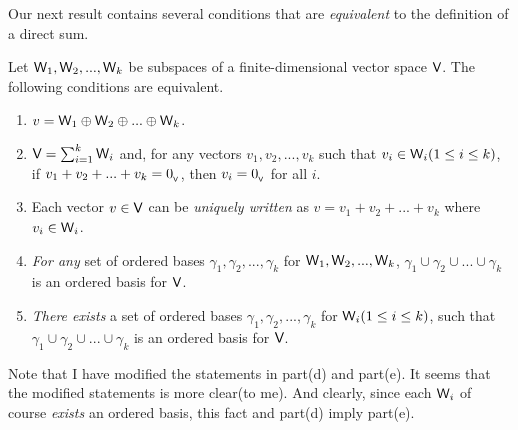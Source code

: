 Our next result contains several conditions that are \emph{equivalent} to the definition of a direct sum.

\begin{theorem} \label{thm 5.9}
Let \(\textsf{W}_1, \textsf{W}_2, ..., \textsf{W}_k\) be subspaces of a finite-dimensional vector space \(\textsf{V}\).
The following conditions are equivalent.

\begin{enumerate}
\item \(v = \textsf{W}_1 \oplus \textsf{W}_2 \oplus ... \oplus \textsf{W}_k\).
\item \(\textsf{V} = \sum_{i = 1}^k \textsf{W}_i\) and, for any vectors \(v_1, v_2, ..., v_k\) such that \(v_i \in \textsf{W}_i
(1 \le i \le k)\), if \(v_1 + v_2 + ... + v_k = 0_{_{\textsf{V}}}\), then \(v_i = 0_{_{\textsf{V}}}\) for all \(i\).
\item Each vector \(v \in \textsf{V}\) can be \emph{uniquely written} as \(v = v_1 + v_2 + ... + v_k\) where \(v_i \in \textsf{W}_i\).
\item\RED{*} \emph{For any} set of ordered bases \(\gamma_1, \gamma_2, ..., \gamma_k\) for \(\textsf{W}_1, \textsf{W}_2, ..., \textsf{W}_k\), \(\gamma_1 \cup \gamma_2 \cup ... \cup \gamma_k\) is an ordered basis for \(\textsf{V}\).
\item\RED{**} \emph{There exists} a set of ordered bases \(\gamma_1, \gamma_2, ..., \gamma_k\) for \(\textsf{W}_i (1 \le i \le k)\), such that \(\gamma_1 \cup \gamma_2 \cup ... \cup \gamma_k\) is an ordered basis for \(\textsf{V}\).
\end{enumerate}
\end{theorem}

\begin{remark} \label{remark 5.2.8}
Note that I have modified the statements in part(d) and part(e).
It seems that the modified statements is more clear(to me).
And clearly, since each \(\textsf{W}_i\) of course \emph{exists} an ordered basis, this fact and part(d) imply part(e).
\end{remark}

